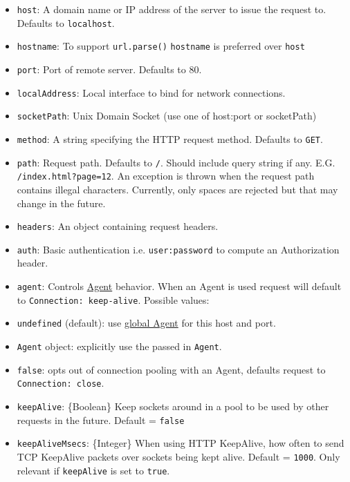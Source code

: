 \begin{itemize}
\itemsep1pt\parskip0pt
\item
  \texttt{host}: A domain name or IP address of the server to issue the
  request to. Defaults to
  \texttt{\textquotesingle{}localhost\textquotesingle{}}.
\item
  \texttt{hostname}: To support \texttt{url.parse()} \texttt{hostname}
  is preferred over \texttt{host}
\item
  \texttt{port}: Port of remote server. Defaults to 80.
\item
  \texttt{localAddress}: Local interface to bind for network
  connections.
\item
  \texttt{socketPath}: Unix Domain Socket (use one of host:port or
  socketPath)
\item
  \texttt{method}: A string specifying the HTTP request method. Defaults
  to \texttt{\textquotesingle{}GET\textquotesingle{}}.
\item
  \texttt{path}: Request path. Defaults to
  \texttt{\textquotesingle{}/\textquotesingle{}}. Should include query
  string if any. E.G.
  \texttt{\textquotesingle{}/index.html?page=12\textquotesingle{}}. An
  exception is thrown when the request path contains illegal characters.
  Currently, only spaces are rejected but that may change in the future.
\item
  \texttt{headers}: An object containing request headers.
\item
  \texttt{auth}: Basic authentication i.e.
  \texttt{\textquotesingle{}user:password\textquotesingle{}} to compute
  an Authorization header.
\item
  \texttt{agent}: Controls
  \hyperref[httpux5fclassux5fhttpux5fagent]{Agent} behavior. When an
  Agent is used request will default to
  \texttt{Connection:\ keep-alive}. Possible values:
\item
  \texttt{undefined} (default): use
  \hyperref[httpux5fhttpux5fglobalagent]{global Agent} for this host and
  port.
\item
  \texttt{Agent} object: explicitly use the passed in \texttt{Agent}.
\item
  \texttt{false}: opts out of connection pooling with an Agent, defaults
  request to \texttt{Connection:\ close}.
\item
  \texttt{keepAlive}: \{Boolean\} Keep sockets around in a pool to be
  used by other requests in the future. Default = \texttt{false}
\item
  \texttt{keepAliveMsecs}: \{Integer\} When using HTTP KeepAlive, how
  often to send TCP KeepAlive packets over sockets being kept alive.
  Default = \texttt{1000}. Only relevant if \texttt{keepAlive} is set to
  \texttt{true}.
\end{itemize}

